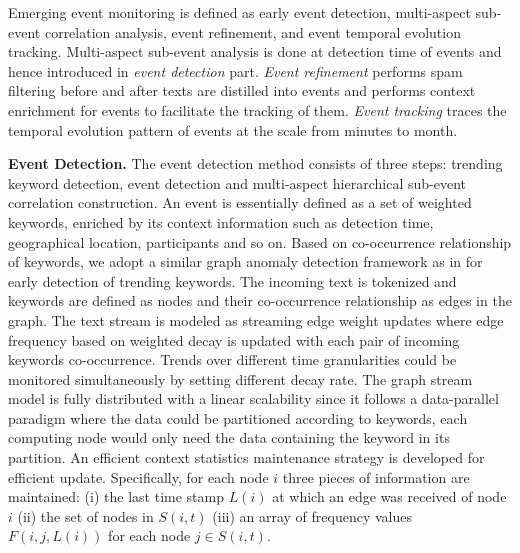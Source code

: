 Emerging event monitoring is defined as early event detection, multi-aspect sub-event correlation analysis, event refinement, and event temporal evolution tracking.
Multi-aspect sub-event analysis is done at detection time of events and hence introduced in \emph{event detection} part.
\emph{Event refinement} performs spam filtering before and after texts are distilled into events and performs context enrichment for events to facilitate the tracking of them.
\emph{Event tracking} traces the temporal evolution pattern of events at the scale from minutes to month.


\noindent\textbf{Event Detection.}
\label{detection}
The event detection method consists of three steps: trending keyword detection, event detection and multi-aspect hierarchical sub-event correlation construction.
An event is essentially defined as a set of weighted keywords, enriched by its context information such as detection time, geographical location, participants and so on.
Based on co-occurrence relationship of keywords, we adopt a similar graph anomaly detection framework as in \cite{yu2013anomalous} for early detection of trending keywords.
The incoming text is tokenized and keywords are defined as nodes and their co-occurrence relationship as edges in the graph.
The text stream is modeled as streaming edge weight updates where edge frequency based on weighted decay is updated with each pair of incoming keywords co-occurrence.
Trends over different time granularities could be monitored simultaneously by setting different decay rate.
The graph stream model is fully distributed with a linear scalability since it follows a data-parallel paradigm where the data could be partitioned according to keywords, \ie each computing node would only need the data containing the keyword in its partition.
An efficient context statistics maintenance strategy is developed for efficient update.
Specifically, for each node $i$ three pieces of information are maintained:
(i) the last time stamp $L(i)$ at which an edge was received of node $i$
(ii) the set of nodes in $S(i,t)$
(iii) an array of frequency values $F(i, j, L(i))$ for each node $j\in S(i,t)$.

